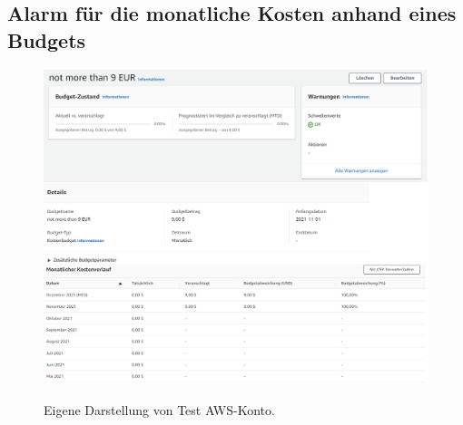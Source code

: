 \subsection{Alarm für die monatliche Kosten anhand eines Budgets}\label{sec_Ang_B}
\begin{figure}[h!]
    \centering
    \includegraphics[scale=0.5]{sources/BudgetAlarm}
    \caption[Budgetalarm]{}
    \label{fig:CloudWatchDashboardTest} 
    Eigene Darstellung von Test AWS-Konto.
  \end{figure}

